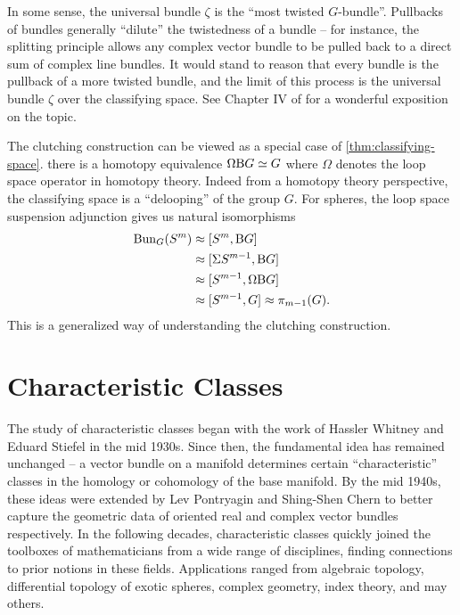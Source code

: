 In some sense, the universal bundle $\zeta$ is the ``most twisted $G$-bundle''. Pullbacks of bundles generally ``dilute'' the twistedness of a bundle -- for instance, the splitting principle allows any complex vector bundle to be pulled back to a direct sum of complex line bundles. It would stand to reason that every bundle is the pullback of a more twisted bundle, and the limit of this process is the universal bundle $\zeta$ over the classifying space. See Chapter IV of \cite{botttu1982differential} for a wonderful exposition on the topic.


\begin{remark}\label{rmk:clutching-construction-generalization}
	The clutching construction can be viewed as a special case of \cref{thm:classifying-space}.
	 there is a homotopy equivalence $\Omega \mathrm{B} G \simeq G$ where $\Omega$ denotes the loop space operator in homotopy theory. Indeed from a homotopy theory perspective, the classifying space is a ``delooping'' of the group $G$. For spheres, the loop space suspension adjunction gives us natural isomorphisms
	\[
		\begin{aligned}
			\operatorname{Bun}_{G}(S^m) & \approx [S^m, \mathrm{B} G]            \\
			              & \approx [\Sigma S^{m-1}, \mathrm{B} G] \\
			              & \approx [S^{m-1}, \Omega\mathrm{B} G]  \\
			              & \approx [S^{m-1}, G]
			\approx \pi_{m-1}(G).
		\end{aligned}
	\]
	This is a generalized way of understanding the clutching construction.
\end{remark}

\pagebreak
\section{Characteristic Classes}
The study of characteristic classes began with the work of Hassler Whitney and Eduard Stiefel in the mid 1930s. Since then, the fundamental idea has remained unchanged -- a vector bundle on a manifold determines certain ``characteristic'' classes in the homology or cohomology of the base manifold.
By the mid 1940s, these ideas were extended by Lev Pontryagin and Shing-Shen Chern to better capture the geometric data of oriented real and complex vector bundles respectively. In the following decades, characteristic classes quickly joined the toolboxes of mathematicians from a wide range of disciplines, finding connections to prior notions in these fields.
Applications ranged from algebraic topology, differential topology of exotic spheres, complex geometry, index theory, and may others.

